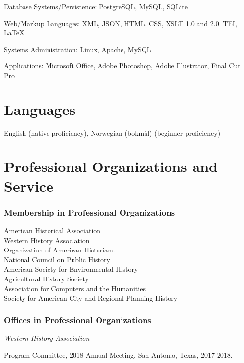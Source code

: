 Database Systems/Persistence: PostgreSQL, MySQL, SQLite

Web/Markup Languages: XML, JSON, HTML, CSS, XSLT 1.0 and 2.0, TEI,
\LaTeX

Systems Administration: Linux, Apache, MySQL

Applications: Microsoft Office, Adobe Photoshop, Adobe Illustrator,
Final Cut Pro

\hypertarget{languages}{%
\section{Languages}\label{languages}}

English (native proficiency), Norwegian (bokm\r{a}l) (beginner
proficiency)

\hypertarget{professional-organizations-and-service}{%
\section{Professional Organizations and
Service}\label{professional-organizations-and-service}}

\hypertarget{membership-in-professional-organizations}{%
\subsubsection{Membership in Professional
Organizations}\label{membership-in-professional-organizations}}

American Historical Association\\
Western History Association\\
Organization of American Historians\\
National Council on Public History\\
American Society for Environmental History\\
Agricultural History Society\\
Association for Computers and the Humanities\\
Society for American City and Regional Planning History

\hypertarget{offices-in-professional-organizations}{%
\subsubsection{Offices in Professional
Organizations}\label{offices-in-professional-organizations}}

\emph{Western History Association}

Program Committee, 2018 Annual Meeting, San Antonio, Texas, 2017-2018.

